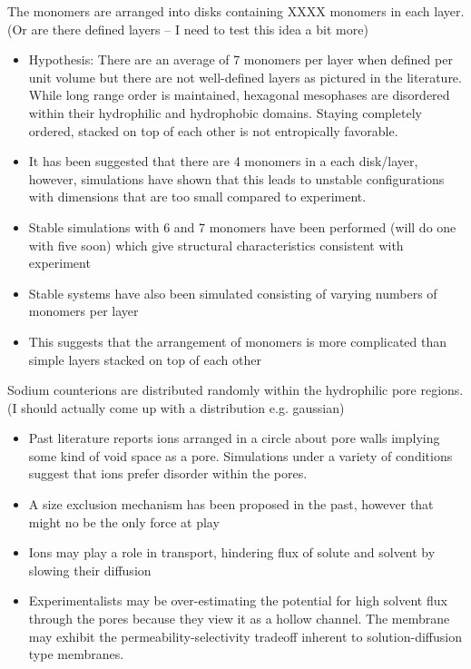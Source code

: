 \documentclass{article}
\begin{document}
	The monomers are arranged into disks containing XXXX monomers in each layer. (Or are there defined layers -- I need to test this idea a bit more) 
	\begin{itemize}
		\item Hypothesis: There are an average of 7 monomers per layer when defined per unit volume but there are not well-defined layers as pictured in the literature. While long range order is maintained, hexagonal mesophases are disordered within their hydrophilic and hydrophobic domains. Staying completely ordered, stacked on top of each other is not entropically favorable.
	        \item It has been suggested that there are 4 monomers in a each disk/layer, however, simulations have shown that this leads to unstable configurations with dimensions that are too small compared to experiment.
                \item Stable simulations with 6 and 7 monomers have been performed (will do one with five soon) which give structural characteristics consistent with experiment
                \item Stable systems have also been simulated consisting of varying numbers of monomers per layer
                \item This suggests that the arrangement of monomers is more complicated than simple layers stacked on top of each other
	\end{itemize}

	Sodium counterions are distributed randomly within the hydrophilic pore regions. (I should actually come up with a distribution e.g. gaussian)
	\begin{itemize}
		\item Past literature reports ions arranged in a circle about pore walls implying some kind of void space as a pore. Simulations under a variety of conditions suggest that ions prefer disorder within the pores. 
		\item A size exclusion mechanism has been proposed in the past, however that might no be the only force at play
		\item Ions may play a role in transport, hindering flux of solute and solvent by slowing their diffusion
		\item Experimentalists may be over-estimating the potential for high solvent flux through the pores because they view it as a hollow channel. The membrane may exhibit the permeability-selectivity tradeoff inherent to solution-diffusion type membranes. %
        \end{itemize}	
\end{document}
